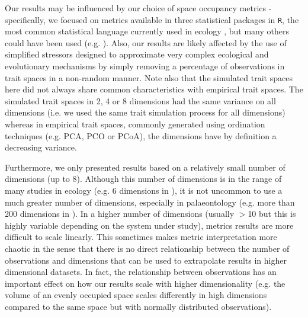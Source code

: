 \documentclass[12pt,letterpaper]{article}
\begin{document}
Our results may be influenced by our choice of space occupancy metrics - specifically, we focused on metrics available in three statistical packages in \texttt{R}, the most common statistical language currently used in ecology \citep{lai2019evaluating}, but many others could have been used (e.g. \citealt{guillerme2020shifting}).
Also, our results are likely affected by the use of simplified stressors designed to approximate very complex ecological and evolutionary mechanisms by simply removing a percentage of observations in trait spaces in a non-random manner.
Note also that the simulated trait spaces here did not always share common characteristics with empirical trait spaces.
The simulated trait spaces in 2, 4 or 8 dimensions had the same variance on all dimensions (i.e. we used the same trait simulation process for all dimensions) whereas in empirical trait spaces, commonly generated using ordination techniques (e.g. PCA, PCO or PCoA), the dimensions have by definition a decreasing variance.

Furthermore, we only presented results based on a relatively small number of dimensions (up to 8).
Although this number of dimensions is in the range of many studies in ecology (e.g. 6 dimensions in \citealt{healy2019animal}), it is not uncommon to use a much greater number of dimensions, especially in palaeontology (e.g. more than 200 dimensions in \citealt{van2023should}).
In a higher number of dimensions (usually $>$10 but this is highly variable depending on the system under study), metrics results are more difficult to scale linearly.
This sometimes makes metric interpretation more chaotic \citep{bellman1957dynamic} in the sense that there is no direct relationship between the number of observations and dimensions that can be used to extrapolate results in higher dimensional datasets.
In fact, the relationship between observations has an important effect on how our results scale with higher dimensionality (e.g. the volume of an evenly occupied space scales differently in high dimensions compared to the same space but with normally distributed observations).
\end{document}
